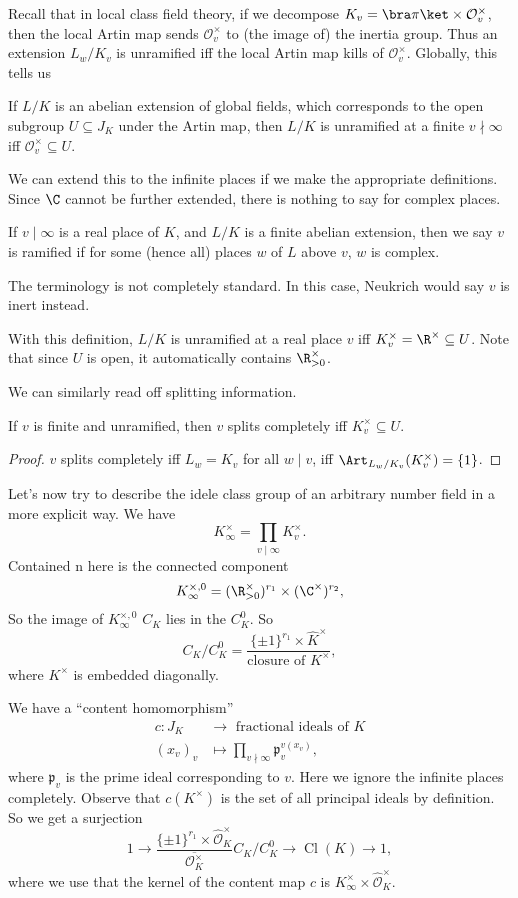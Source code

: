 \documentclass[a4paper]{article}
\DeclareMathOperator\Cl{\mathrm{Cl}}
\begin{document}
Recall that in local class field theory, if we decompose $K_v = \bra \pi\ket \times \mathcal{O}_v^\times$, then the local Artin map sends $\mathcal{O}_v^\times$ to (the image of) the inertia group. Thus an extension $L_w/K_v$ is unramified iff the local Artin map kills of $\mathcal{O}_v^\times$. Globally, this tells us
\begin{prop}
  If $L/K$ is an abelian extension of global fields, which corresponds to the open subgroup $U \subseteq J_K$ under the Artin map, then $L/K$ is unramified at a finite $v \nmid \infty$ iff $\mathcal{O}_v^\times \subseteq U$.
\end{prop}

We can extend this to the infinite places if we make the appropriate definitions. Since $\C$ cannot be further extended, there is nothing to say for complex places. 
\begin{defi}[Ramification]
  If $v \mid \infty$ is a real place of $K$, and $L/K$ is a finite abelian extension, then we say $v$ is ramified if for some (hence all) places $w$ of $L$ above $v$, $w$ is complex.
\end{defi}
The terminology is not completely standard. In this case, Neukrich would say $v$ is inert instead.

With this definition, $L/K$ is unramified at a real place $v$ iff $K_v^\times = \R^\times \subseteq U$. Note that since $U$ is open, it automatically contains $\R^\times_{> 0}$.

We can similarly read off splitting information.
\begin{prop}
  If $v$ is finite and unramified, then $v$ splits completely iff $K_v^\times \subseteq U$.
\end{prop}
\begin{proof}
  $v$ splits completely iff $L_w = K_v$ for all $w \mid v$, iff $\Art_{L_w/K_v}(K_v^\times) = \{1\}$.
\end{proof}

Let's now try to describe the idele class group of an arbitrary number field in a more explicit way. We have
\[
  K_\infty^\times = \prod_{v \mid \infty} K_v^\times.
\]
Contained n here is the connected component
\[
  K_\infty^{\times, 0} = (\R^\times_{> 0})^{r_1} \times (\C^\times)^{r_2},
\]
So the image of $K_\infty^{\times, 0}$ $C_K$ lies in the $C_K^0$. So
\[
  C_K/C_K^0 = \frac{\{\pm 1\}^{r_1} \times \hat{K}^\times}{\text{closure of }K^\times},
\]
where $K^\times$ is embedded diagonally.

We have a ``content homomorphism''
\begin{align*}
  c: J_K&\to \text{ fractional ideals of }K\\
  (x_v)_v &\mapsto \prod_{v \nmid \infty}\mathfrak{p}_v^{v(x_v)},
\end{align*}
where $\mathfrak{p}_v$ is the prime ideal corresponding to $v$. Here we ignore the infinite places completely. Observe that $c(K^\times)$ is the set of all principal ideals by definition. So we get a surjection
\[
  1 \to \frac{\{\pm 1\}^{r_1} \times \hat{\mathcal{O}}_K^\times}{\overline{\mathcal{O}_K^\times}} C_K /C_K^0 \to \Cl(K) \to 1,
\]
where we use that the kernel of the content map $c$ is $K_\infty^\times \times \hat{\mathcal{O}}_K^\times$.
\end{document}
